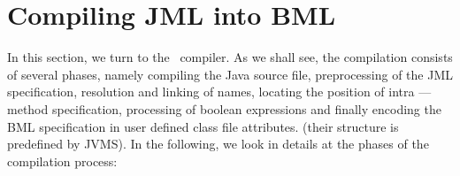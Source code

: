 


\section{Compiling JML into BML}\label{BCSLcompile}


In this section, we turn to the \JMLtoBML \ compiler.
As we shall see, the compilation consists of several phases, namely compiling the Java source file, 
preprocessing of the JML specification, resolution
and linking of names, locating the position of intra --- method specification, processing of boolean expressions and 
finally encoding the BML specification in user defined class file attributes.  (their structure is predefined by JVMS).
In the following, we look in details at the phases of the compilation process:

